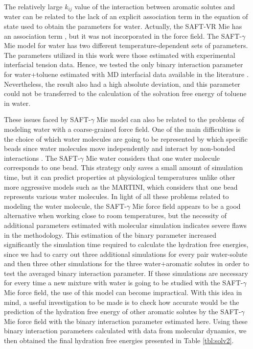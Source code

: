 The relatively large $k_{ij}$ value of the interaction between aromatic solutes and water can be related to the lack of an explicit association term in the equation of state used to obtain the parameters for water. Actually, the SAFT-VR Mie has an association term \cite{lafitte2013}, but it was not incorporated in the force field. The SAFT-$\gamma$ Mie model for water \cite{lobanova2016} has two different temperature-dependent sets of parameters. The parameters utilized in this work were those estimated with experimental interfacial tension data. Hence, we tested the only binary interaction parameter for water+toluene estimated with MD interfacial data available in the literature \cite{herdes2017}. Nevertheless, the result also had a high absolute deviation, and this parameter could not be transferred to the calculation of the solvation free energy of toluene in water. 

These issues faced by SAFT-$\gamma$ Mie model can also be related to the problems of modeling water with a coarse-grained force field. One of the main difficulties is the choice of which water molecules are going to be represented by which specific beads since water molecules move independently and interact by non-bonded interactions \cite{hadley2010,hadley2012}. The  SAFT-$\gamma$ Mie water considers that one water molecule corresponds to one bead. This strategy only saves a small amount of simulation time, but it can predict properties at physiological temperatures unlike other more aggressive models such as the MARTINI, which considers that one bead represents various water molecules. In light of all these problems related to modeling the water molecule, the SAFT-$\gamma$ Mie force field appears to be a good alternative when working close to room temperatures, but the necessity of additional parameters estimated with molecular simulation indicates severe flaws in the methodology. This estimation of the binary parameter increased significantly the simulation time required to calculate the hydration free energies, since we had to carry out three additional simulations for every pair water-solute and then three other simulations for the three water+aromatic solutes in order to test the averaged binary interaction parameter. If these simulations are necessary for every time a new mixture with water is going to be studied with the SAFT-$\gamma$ Mie force field, the use of this model can become impractical.  With this idea in mind, a useful investigation to be made is to check how accurate would be the prediction of the hydration free energy of other aromatic solutes by the SAFT-$\gamma$ Mie force field with the binary interaction parameter estimated here. Using these binary interaction parameters calculated with data from molecular dynamics, we then obtained the final hydration free energies presented in Table \ref{tbl:solv2}. 

